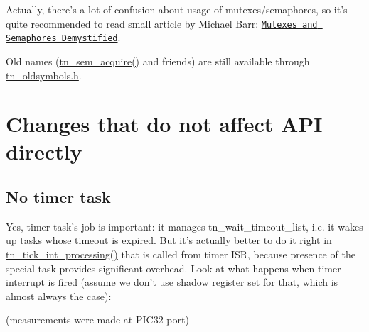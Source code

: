 Actually, there's a lot of confusion about usage of mutexes/semaphores, so it's quite recommended to read small article by Michael Barr\+: \href{http://goo.gl/YprPBW}{\tt Mutexes and Semaphores Demystified}.

Old names ({\ttfamily \hyperlink{tn__oldsymbols_8h_abdc5c428590ff525cdb566da613015ce}{tn\+\_\+sem\+\_\+acquire()}} and friends) are still available through {\ttfamily \hyperlink{tn__oldsymbols_8h}{tn\+\_\+oldsymbols.\+h}}.\hypertarget{tnkernel_diff_tnkernel_diff_other}{}\section{Changes that do not affect A\+P\+I directly}\label{tnkernel_diff_tnkernel_diff_other}
\hypertarget{tnkernel_diff_tnkernel_diff_timer_task}{}\subsection{No timer task}\label{tnkernel_diff_tnkernel_diff_timer_task}
Yes, timer task's job is important\+: it manages {\ttfamily tn\+\_\+wait\+\_\+timeout\+\_\+list}, i.\+e. it wakes up tasks whose timeout is expired. But it's actually better to do it right in {\ttfamily \hyperlink{tn__sys_8h_a944d96c7a5d442d271115b6cb22a085b}{tn\+\_\+tick\+\_\+int\+\_\+processing()}} that is called from timer I\+S\+R, because presence of the special task provides significant overhead. Look at what happens when timer interrupt is fired (assume we don't use shadow register set for that, which is almost always the case)\+:

(measurements were made at P\+I\+C32 port)


